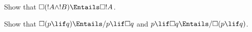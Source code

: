 \documentclass[../../../include/open-logic-section]{subfiles}
\begin{document}
\begin{prob}
  Show that $\Box (!A \land !B) \Entails \Box !A$.
\end{prob}

\begin{prob}
  Show that $\Box (p \lif q) \Entails/ p \lif \Box q$ and $p \lif \Box
  q \Entails/\Box (p \lif q)$.
\end{prob}
\end{document}
